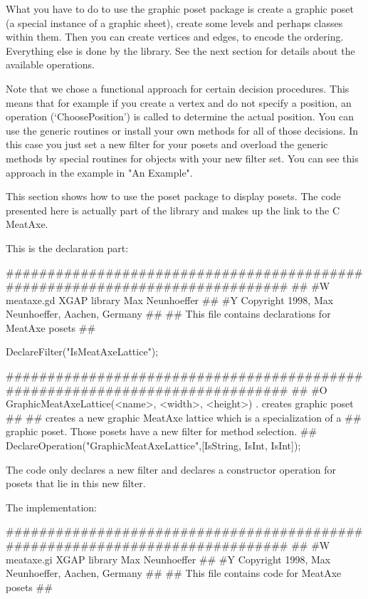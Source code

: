 What you have to do to use the graphic poset package is create a graphic
poset (a special instance of a graphic sheet), create some levels and
perhaps classes within them. Then you can create vertices and edges, to
encode the ordering. Everything else is done by the library. See the next
section for details about the available operations.

Note that we chose a functional approach for certain decision
procedures. This means that for example if you create a vertex and do not
specify a position, an operation (`ChoosePosition') is called to determine
the actual position. You can use the generic routines or install your own
methods for all of those decisions. In this case you just set a new filter
for your posets and overload the generic methods by special routines for
objects with your new filter set. You can see this approach in the example
in "An Example".




This section shows how to use the poset package to display posets. The code
presented here is actually part of the {\XGAP} library and makes up the
link to the C MeatAxe.

This is the declaration part:

\beginexample
#############################################################################
##
#W  meataxe.gd                  XGAP library                  Max Neunhoeffer
##
#Y  Copyright 1998,       Max Neunhoeffer,              Aachen,       Germany
##
##  This file contains declarations for MeatAxe posets
##

DeclareFilter("IsMeatAxeLattice");

#############################################################################
##
#O  GraphicMeatAxeLattice(<name>, <width>, <height>)  . creates graphic poset
##
##  creates a new graphic MeatAxe lattice which is a specialization of a
##  graphic poset. Those posets have a new filter for method selection.
##
DeclareOperation("GraphicMeatAxeLattice",[IsString, IsInt, IsInt]);
\endexample

The code only declares a new filter and declares a constructor operation
for posets that lie in this new filter.

The implementation:

\beginexample
#############################################################################
##
#W  meataxe.gi                  XGAP library                  Max Neunhoeffer
##
#Y  Copyright 1998,       Max Neunhoeffer,              Aachen,       Germany
##
##  This file contains code for MeatAxe posets
##

